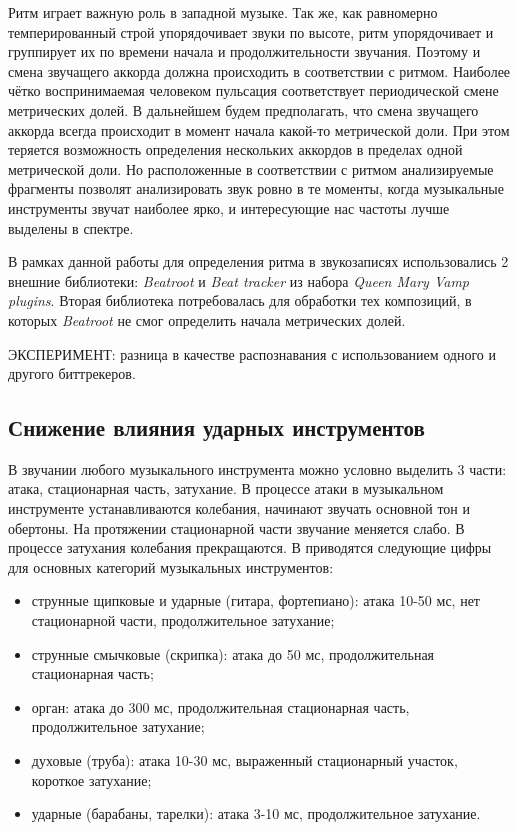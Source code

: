 Ритм играет важную роль в западной музыке. Так же, как равномерно
темперированный строй упорядочивает звуки по высоте, ритм упорядочивает и
группирует их по времени начала и продолжительности звучания. Поэтому и смена
звучащего аккорда должна происходить в соответствии с ритмом. Наиболее чётко
воспринимаемая человеком пульсация соответствует периодической смене метрических
долей. В дальнейшем будем предполагать, что смена звучащего аккорда всегда
происходит в момент начала какой-то метрической доли. При этом теряется
возможность определения нескольких аккордов в пределах одной метрической доли.
Но расположенные в соответствии с ритмом анализируемые фрагменты позволят
анализировать звук ровно в те моменты, когда музыкальные инструменты звучат
наиболее ярко, и интересующие нас частоты лучше выделены в спектре.

В рамках данной работы для определения ритма в звукозаписях использовались 2
внешние библиотеки: \emph{Beatroot} \cite{Dixon2007} и \emph{Beat tracker}
\cite{Davies2007} из набора \emph{Queen Mary Vamp plugins}. Вторая библиотека
потребовалась для обработки тех композиций, в которых \emph{Beatroot} не
смог определить начала метрических долей.

ЭКСПЕРИМЕНТ: разница в качестве распознавания с использованием одного и другого
биттрекеров.

\subsection{Снижение влияния ударных инструментов}

В звучании любого музыкального инструмента можно условно выделить 3 части:
атака, стационарная часть, затухание. В процессе атаки в музыкальном
инструменте устанавливаются колебания, начинают звучать основной тон и
обертоны. На протяжении стационарной части звучание меняется слабо. В процессе
затухания колебания прекращаются. В \cite{Aldoshina2006} приводятся следующие
цифры для основных категорий музыкальных инструментов:
\begin{itemize}
  \item струнные щипковые и ударные (гитара, фортепиано): атака 10-50 мс, нет
  стационарной части, продолжительное затухание;
  \item струнные смычковые (скрипка): атака до 50 мс, продолжительная
  стационарная часть;
  \item орган: атака до 300 мс, продолжительная стационарная часть,
  продолжительное затухание;
  \item духовые (труба): атака 10-30 мс, выраженный стационарный участок,
  короткое затухание;
  \item ударные (барабаны, тарелки): атака 3-10 мс, продолжительное затухание.
\end{itemize}

